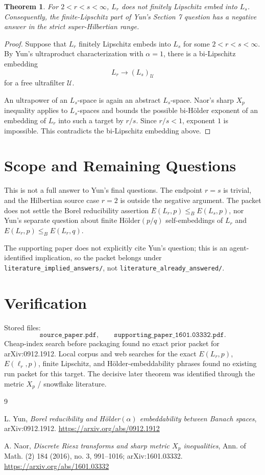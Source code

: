\documentclass[11pt]{article}
\newtheorem*{theorem}{Theorem}
\begin{document}
\begin{theorem}
For \(2<r<s<\infty\), \(L_r\) does not finitely Lipschitz embed into \(L_s\).
Consequently, the finite-Lipschitz part of Yun's Section 7 question has a
negative answer in the strict super-Hilbertian range.
\end{theorem}

\begin{proof}
Suppose that \(L_r\) finitely Lipschitz embeds into \(L_s\) for some
\(2<r<s<\infty\). By Yun's ultraproduct characterization with \(\alpha=1\),
there is a bi-Lipschitz embedding
\[
L_r \longrightarrow (L_s)_{\mathcal U}
\]
for a free ultrafilter \(\mathcal U\).

An ultrapower of an \(L_s\)-space is again an abstract \(L_s\)-space. Naor's
sharp \(X_p\) inequality applies to \(L_s\)-spaces and bounds the possible
bi-H\"older exponent of an embedding of \(L_r\) into such a target by \(r/s\).
Since \(r/s<1\), exponent \(1\) is impossible. This contradicts the
bi-Lipschitz embedding above.
\end{proof}

\section*{Scope and Remaining Questions}

This is not a full answer to Yun's final questions. The endpoint \(r=s\) is
trivial, and the Hilbertian source case \(r=2\) is outside the negative
argument. The packet does not settle the Borel reducibility assertion
\(E(L_r,p)\le_B E(L_s,p)\), nor Yun's separate question about finite
H\"older\((p/q)\) self-embeddings of \(L_r\) and \(E(L_r,p)\le_B E(L_r,q)\).

The supporting paper does not explicitly cite Yun's question; this is an
agent-identified implication, so the packet belongs under
\texttt{literature\_implied\_answers/}, not
\texttt{literature\_already\_answered/}.

\section*{Verification}

Stored files:
\[
\texttt{source\_paper.pdf},\qquad
\texttt{supporting\_paper\_1601.03332.pdf}.
\]
Cheap-index search before packaging found no exact prior packet for
arXiv:0912.1912. Local corpus and web searches for the exact \(E(L_r,p)\),
\(E(\ell_r,p)\), finite Lipschitz, and H\"older-embeddability phrases found no
existing run packet for this target. The decisive later theorem was identified
through the metric \(X_p\) / snowflake literature.

\begin{thebibliography}{9}

L. Yun,
\emph{Borel reducibility and H\"older\((\alpha)\) embeddability between Banach
spaces},
arXiv:0912.1912.
\url{https://arxiv.org/abs/0912.1912}

A. Naor,
\emph{Discrete Riesz transforms and sharp metric \(X_p\) inequalities},
Ann. of Math. (2) 184 (2016), no. 3, 991--1016;
arXiv:1601.03332.
\url{https://arxiv.org/abs/1601.03332}

\end{thebibliography}
\end{document}

